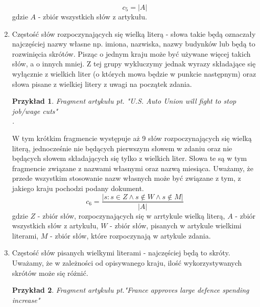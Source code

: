 \documentclass{classrep}
\newtheorem{exmp}{Przykład}[section]
\begin{document}
\begin{enumerate}
    \begin{equation}
        c_5 = |A|
    \end{equation}
    gdzie $A$ - zbiór wszystkich słów z artykułu. \\
    \item Częstość słów rozpoczynających się wielką literą - słowa takie będą oznaczały najczęściej  nazwy własne np. imiona, nazwiska, nazwy budynków lub będą to rozwinięcia skrótów. Pisząc o jednym kraju może być używane więcej takich słów, 
	a o innych mniej. Z tej grupy wykluczymy jednak wyrazy składające się wyłącznie z wielkich liter (o których mowa będzie w punkcie następnym) oraz słowa pisane z wielkiej litery z uwagi na początek zdania. \\
	\begin{exmp}Fragment artykułu pt. "U.S. Auto Union will fight to stop job/wage cuts" \cite{reuters}\\
	. \\
    \end{exmp}
    W tym krótkim fragmencie występuje aż 9 słów rozpoczynających się wielką literą, jednocześnie nie będących pierwszym słowem w zdaniu oraz nie będących słowem składających się tylko z wielkich liter. Słowa te są w tym fragmencie związane z nazwami własnymi oraz nazwą miesiąca. Uważamy, że przede wszystkim stosowanie nazw własnych może być związane z tym, z jakiego kraju pochodzi podany dokument.
     \begin{equation}
        c_6 = \frac{|{s: s \in Z \land s \notin W \land s \notin M}|}{|A|}
    \end{equation}
    gdzie $Z$ - zbiór słów, rozpoczynających się w arrtykule wielką literą, $A$ - zbiór wszystkich słów z artykułu, $W$ - zbiór słów, pisanych w artykule wielkimi literami, $M$ - zbiór słów, które rozpoczynają w artykule zdania. \\
    \item Częstość słów pisanych wielkymi literami - najczęściej będą to skróty. Uważamy, że w zależności od opisywanego kraju, ilość wykorzystywanych skrótów może się różnić. \\
    \begin{exmp}Fragment artykułu pt."France approves large defence spending increase" \cite{reuters} \\
\end{exmp}
\end{enumerate}
\end{document}
